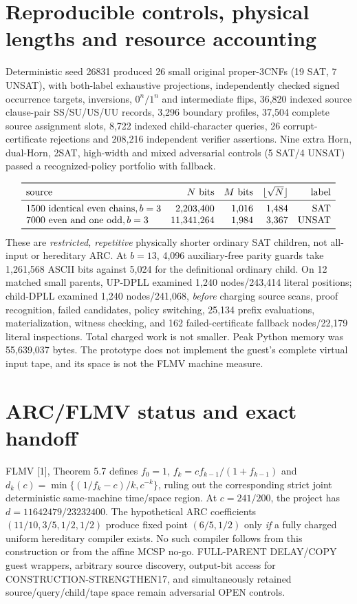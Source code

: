 \documentclass[11pt]{article}
\begin{document}
\section{Reproducible controls, physical lengths and resource accounting}
Deterministic seed 26831 produced 26 small original proper-3CNFs (19 SAT, 7 UNSAT), with both-label exhaustive projections, independently checked signed occurrence targets, inversions, $0^n/1^n$ and intermediate flips, 36,820 indexed source clause-pair SS/SU/US/UU records, 3,296 boundary profiles, 37,504 complete source assignment slots, 8,722 indexed child-character queries, 26 corrupt-certificate rejections and 208,216 independent verifier assertions. Nine extra Horn, dual-Horn, 2SAT, high-width and mixed adversarial controls (5 SAT/4 UNSAT) passed a recognized-policy portfolio with fallback.

\[
\begin{array}{lrrrr}
\toprule
\text{source}&N\text{ bits}&M\text{ bits}&\lfloor\sqrt N\rfloor&\text{label}\\\midrule
1500\ \text{identical even chains}, b=3&2{,}203{,}400&1{,}016&1{,}484&\mathrm{SAT}\\
7000\ \text{even and one odd}, b=3&11{,}341{,}264&1{,}984&3{,}367&\mathrm{UNSAT}\\\bottomrule
\end{array}
\]
These are \emph{restricted, repetitive} physically shorter ordinary SAT children, not all-input or hereditary ARC. At $b=13$, 4,096 auxiliary-free parity guards take 1,261,568 ASCII bits against 5,024 for the definitional ordinary child. On 12 matched small parents, UP-DPLL examined 1,240 nodes/243,414 literal positions; child-DPLL examined 1,240 nodes/241,068, \emph{before} charging source scans, proof recognition, failed candidates, policy switching, 25,134 prefix evaluations, materialization, witness checking, and 162 failed-certificate fallback nodes/22,179 literal inspections. Total charged work is not smaller. Peak Python memory was 55,639,037 bytes. The prototype does not implement the guest's complete virtual input tape, and its space is not the FLMV machine measure.

\section{ARC/FLMV status and exact handoff}
FLMV [1], Theorem 5.7 defines $f_0=1$, $f_k=cf_{k-1}/(1+f_{k-1})$ and $d_k(c)=\min\{(1/f_k-c)/k,c^{-k}\}$, ruling out the corresponding strict joint deterministic same-machine time/space region. At $c=241/200$, the project has $d=11642479/23232400$. The hypothetical ARC coefficients $(11/10,3/5,1/2,1/2)$ produce fixed point $(6/5,1/2)$ only \emph{if} a fully charged uniform hereditary compiler exists. No such compiler follows from this construction or from the affine MCSP no-go. FULL-PARENT DELAY/COPY guest wrappers, arbitrary source discovery, output-bit access for CONSTRUCTION-STRENGTHEN17, and simultaneously retained source/query/child/tape space remain adversarial OPEN controls.
\end{document}
